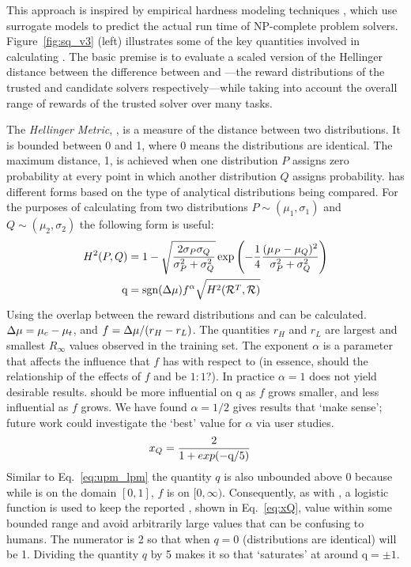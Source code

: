 This approach is inspired by empirical hardness modeling techniques \cite{Leyton-Brown2009-yr}, which use surrogate models to predict the actual run time of NP-complete problem solvers. 
Figure~\ref{fig:sq_v3} (left) illustrates some of the key quantities involved in calculating \xQ{}. The basic premise is to evaluate a scaled version of the Hellinger distance between the difference between \rwdtrust{} and \rwd{}---the reward distributions of the trusted and candidate solvers respectively---while taking into account the overall range of rewards of the trusted solver over many tasks. 

The \emph{Hellinger Metric}, \hell{},  is a measure of the distance between two distributions. It is bounded between 0 and 1, where 0 means the distributions are identical. The maximum distance, 1, is achieved when one distribution $P$ assigns zero probability at every point in which another distribution $Q$ assigns probability. \hell{} has different forms based on the type of analytical distributions being compared. For the purposes of calculating \xQ{} from two distributions $P \sim (\mu_1,\sigma_1)$ and $Q\sim(\mu_2,\sigma_2)$ the following form is useful:
\begin{align}
    \hellmet &= 1-\sqrt{\frac{2\sigma_P\sigma_Q}{\sigma_P^2+\sigma_Q^2}}\exp{\left(-\frac{1}{4}\frac{(\mu_P-\mu_Q)^2}{\sigma_P^2+\sigma_Q^2}\right)} \\
    \text{q} &= \text{sgn}(\dmu)f^{\alpha}\sqrt{H^{2}(\rwdtrust,\rwd)} \label{eq:q}
\end{align}
Using \hell{} the overlap between the reward distributions \rwdtrustpredict{} and \rwdcandsim{} can be calculated. $\Delta \mu= \mu_c-\mu_t$, and $f = \Delta \mu/(r_H-r_L)$. The quantities $r_H$ and $r_L$ are largest and smallest $R_{\infty}$ values observed in the \surrogate{} training set. The exponent $\alpha$ is a parameter that affects the influence that $f$ has with respect to \hell (in essence, should the relationship of the effects of $f$ and \hell{} be $1:1$?). In practice $\alpha=1$ does not yield desirable results. \hell{} should be more influential on $\text{q}$ as $f$ grows smaller, and less influential as $f$ grows. We have found $\alpha=1/2$ gives results that `make sense'; future work could investigate the `best' value for $\alpha$ via user studies.
    \begin{align}
        \xQ &= \frac{2}{1+exp(-\text{q}/5)}\label{eq:xQ}
    \end{align}
Similar to Eq.~\ref{eq:upm_lpm} the quantity $q$ is also unbounded above $0$ because while \hell{} is on the domain $[0,1]$, $f$ is on $[0,\infty)$. Consequently, as with \xO{}, a logistic function is used to keep the reported \xQ{}, shown in Eq.~\ref{eq:xQ}, value within some bounded range and avoid arbitrarily large values that can be confusing to humans. The numerator is 2 so that when $q=0$ (distributions are identical) \xQ{} will be 1. Dividing the quantity $q$ by 5 makes it so that \xQ{} `saturates' at around $\text{q}=\pm1$.

